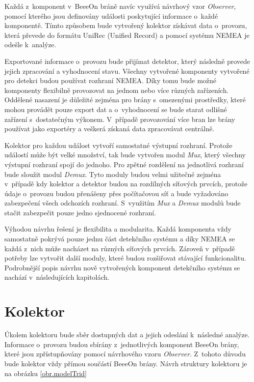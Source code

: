  Každá z~komponent v~BeeeOn bráně navíc využívá návrhový vzor \textit{Observer}, pomocí kterého jsou
 definovány události poskytující informace o~každé komponentě. 
 Tímto způsobem bude vytvořený kolektor získávat data o~provozu, která
 převede do formátu UniRec (Unified Record) a pomocí systému NEMEA je odešle k~analýze.
 
 Exportované informace o~provozu bude přijímat detektor, který následně provede jejich zpracování a 
 vyhodnocení stavu. Všechny vytvořené komponenty vytvořené pro detekci budou používat rozhraní 
 NEMEA. Díky tomu bude možné komponenty flexibilně provozovat na jednom nebo více různých zařízeních.
 Oddělené nasazení je důležité zejména pro brány s~omezenými prostředky, které mohou provádět 
 pouze export dat a o~vyhodnocení se bude starat odlišné zařízení s~dostatečným výkonem. V~případě 
 provozování více bran lze brány používat jako exportéry a veškerá získaná data zpracovávat 
 centrálně. 
 
 Kolektor pro každou událost vytvoří samostatné výstupní rozhraní. Protože událostí může být 
 velké množství, tak bude vytvořen modul \textit{Mux}, který všechny výstupní rozhraní spojí do jednoho. 
 Pro zpětné rozdělení na jednotlivá rozhraní bude sloužit modul \textit{Demux}. Tyto moduly budou velmi užitečné
 zejména v~případě kdy kolektor a detektor budou na rozdílných síťových prvcích, protože údaje 
 o~provozu budou přenášeny přes počítačovou síť a bude vyžadováno zabezpečení všech odchozích
 rozhraní. S~využitím \textit{Mux} a \textit{Demux} modulů bude stačit zabezpečit pouze jedno sjednocené rozhraní. 
 
 Výhodou návrhu řešení je flexibilita a modularita. Každá komponenta vždy samostatně pokrývá pouze jednu
 část detekčního systému a díky NEMEA se každá z~nich může nacházet na různých síťových prvcích. Zároveň
 v~případě potřeby lze vytvořit další moduly, které budou rozšiřovat stávající funkcionalitu.
 Podrobnější popis návrhu nově vytvořených komponent detekčního systému se nachází v~následujících kapitolách.
 
 \section{Kolektor}
 Úkolem kolektoru bude sběr dostupných dat a jejich odeslání k~následné analýze. Informace
o~provozu budou sbírány z~jednotlivých komponent BeeeOn brány, které jsou zpřístupňovány pomocí 
 návrhového vzoru \textit{Observer}. Z~tohoto důvodu bude kolektor vždy přímou součástí BeeeOn brány. 
 Návrh struktury kolektoru je na obrázku \ref{obr.modelTrid}
 
